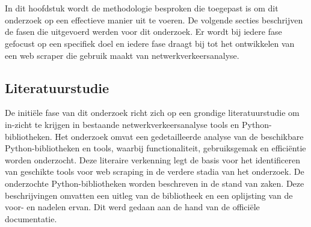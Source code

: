
\chapter{}%
\label{ch:methodologie}


In dit hoofdstuk wordt de methodologie besproken die toegepast is om dit onderzoek op een effectieve manier uit te voeren. De volgende secties beschrijven de fasen die uitgevoerd werden voor dit onderzoek. Er wordt bij iedere fase gefocust op een specifiek doel en iedere fase draagt bij tot het ontwikkelen van een web scraper die gebruik maakt van netwerkverkeersanalyse.

\section{Literatuurstudie}
De initiële fase van dit onderzoek richt zich op een grondige literatuurstudie om in-zicht te krijgen in bestaande netwerkverkeersanalyse tools en Python-bibliotheken. Het onderzoek omvat een gedetailleerde analyse van de beschikbare Python-bibliotheken en tools, waarbij functionaliteit, gebruiksgemak en efficiëntie worden onderzocht. Deze literaire verkenning legt de basis voor het identificeren van geschikte tools voor web scraping in de verdere stadia van het onderzoek. De onderzochte Python-bibliotheken worden beschreven in de stand van zaken. Deze beschrijvingen omvatten een uitleg van de bibliotheek en een oplijsting van de voor- en nadelen ervan. Dit werd gedaan aan de hand van de officiële documentatie.

